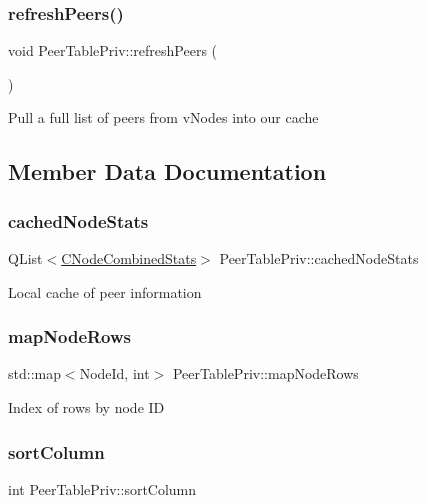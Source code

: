 \subsubsection{\texorpdfstring{refresh\+Peers()}{refreshPeers()}}
{\footnotesize\ttfamily void Peer\+Table\+Priv\+::refresh\+Peers (\begin{DoxyParamCaption}{ }\end{DoxyParamCaption})\hspace{0.3cm}{\ttfamily [inline]}}

Pull a full list of peers from v\+Nodes into our cache 

\subsection{Member Data Documentation}
\mbox{\label{class_peer_table_priv_a8da9d0256d11f205dfa1cdce86843761}} 
\subsubsection{\texorpdfstring{cached\+Node\+Stats}{cachedNodeStats}}
{\footnotesize\ttfamily Q\+List$<$\mbox{\hyperlink{struct_c_node_combined_stats}{C\+Node\+Combined\+Stats}}$>$ Peer\+Table\+Priv\+::cached\+Node\+Stats}

Local cache of peer information \mbox{\label{class_peer_table_priv_ae27db14bcbe769f494c4db56ef27fb08}} 
\subsubsection{\texorpdfstring{map\+Node\+Rows}{mapNodeRows}}
{\footnotesize\ttfamily std\+::map$<$Node\+Id, int$>$ Peer\+Table\+Priv\+::map\+Node\+Rows}

Index of rows by node ID \mbox{\label{class_peer_table_priv_a4917597853d2d5f0055be017b8ab33c5}} 
\subsubsection{\texorpdfstring{sort\+Column}{sortColumn}}
{\footnotesize\ttfamily int Peer\+Table\+Priv\+::sort\+Column}

